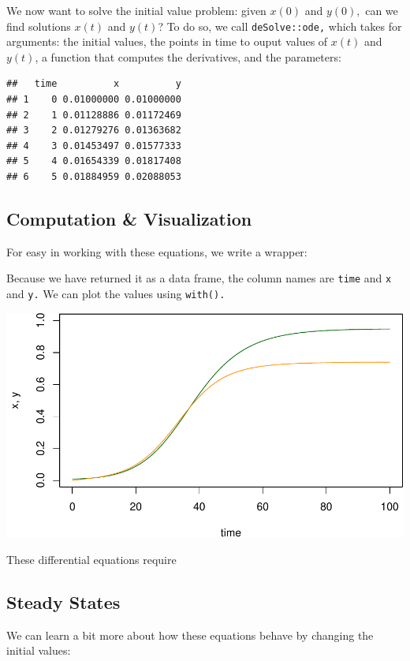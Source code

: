 \documentclass[
]{book}
\begin{document}
We now want to solve the initial value problem: given \(x(0)\) and \(y(0),\) can we find solutions \(x(t)\) and \(y(t)\)? To do so, we call \texttt{deSolve::ode,} which takes for arguments: the initial values, the points in time to ouput values of \(x(t)\) and \(y(t)\), a function that computes the derivatives, and the parameters:

\begin{verbatim}
##   time          x          y
## 1    0 0.01000000 0.01000000
## 2    1 0.01128886 0.01172469
## 3    2 0.01279276 0.01363682
## 4    3 0.01453497 0.01577333
## 5    4 0.01654339 0.01817408
## 6    5 0.01884959 0.02088053
\end{verbatim}

\subsection{Computation \& Visualization}\label{computation-visualization}

For easy in working with these equations, we write a wrapper:

Because we have returned it as a data frame, the column names are \texttt{time} and \texttt{x} and \texttt{y.} We can plot the values using \texttt{with().}

\includegraphics{docs/figs/unnamed-chunk-39-1.pdf}

These differential equations require

\subsection{Steady States}\label{steady-states-1}

We can learn a bit more about how these equations behave by changing the initial values:
\end{document}
